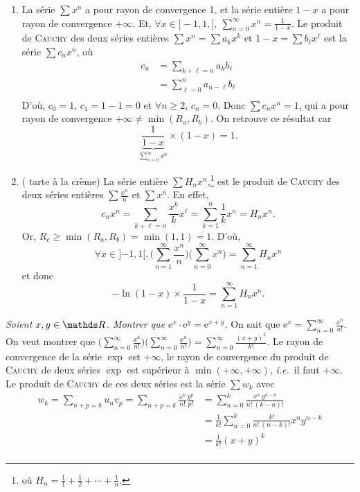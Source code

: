 \begin{exm}
	\begin{enumerate}
		\item La série $\sum x^n$\/ a pour rayon de convergence 1, et la série entière $1 - x$\/ a pour rayon de convergence $+\infty$.
			Et, $\forall x \in {]-1,1,[},\: \sum_{n=0}^\infty x^n = \frac{1}{1-x}$. Le produit de \textsc{Cauchy} des deux séries entières $\sum x^n = \sum a_k x^k$\/ et $1 - x = \sum b_\ell x^\ell$\/ est la série $\sum c_n x^n$, où  
			\begin{align*}
				c_n &= \sum_{k+\ell = n} a_k b_\ell\\
				&= \sum_{\ell=0}^n a_{n-\ell} b_\ell\\
			\end{align*}
			D'où, $c_0 = 1$, $c_1 = 1 - 1 = 0$\/ et $\forall n \ge 2$, $c_n = 0$.
			Donc $\sum c_n x^n = 1$, qui a pour rayon de convergence $+\infty \neq \min(R_a, R_b)$. On retrouve ce résultat car \[
				\underbrace{\frac{1}{1-x}}_{\sum_{n=0}^\infty x^n} \times (1-x) = 1
			.\]
		\item({\color{cyan} tarte à la crème}) La série entière $\sum H_n x^n$,\footnote{où $H_n = \frac{1}{1} + \frac{1}{2} + \cdots + \frac{1}{n}$.} est le produit de \textsc{Cauchy} des deux séries entières $\sum \frac{x^n}{n}$\/ et $\sum x^n$.
			En effet, \[
				c_n x^n = \sum_{k+\ell = n} \frac{x^k}{k} x^\ell = \sum_{k=1}^n \frac{1}{k} x^n = H_n x^n
			.\]
			Or, $R_c \ge \min(R_a, R_b) = \min(1,1) = 1$. D'où, \[
				\forall x \in {]{-1},1[},
				\Big(\sum_{n=1}^\infty \frac{x^n}{n}\Big)\Big(\sum_{n=0}^\infty x^n\Big) = \sum_{n=1}^\infty H_n x^n
			\] et donc \[
				-\ln (1- x) \times \frac{1}{1-x} = \sum_{n=1}^\infty H_n x^n
			.\]
	\end{enumerate}
\end{exm}

\begin{exo}
	\textsl{Soient $x,y \in \R$. Montrer que $\mathrm{e}^x\cdot \mathrm{e}^y = \mathrm{e}^{x+y}$.}
	On sait que $\mathrm{e}^{x} = \sum_{n=0}^\infty \frac{x^n}{n!}$.
	On veut montrer que $\big(\sum_{n=0}^\infty \frac{x^n}{n!}\big)\big(\sum_{n=0}^\infty \frac{x^n}{n!}\big) = \sum_{n=0}^\infty \frac{(x+y)^k}{k!}$. Le rayon de convergence de la série $\exp$\/ est $+\infty$, le rayon de convergence du produit de \textsc{Cauchy} de deux séries $\exp$\/ est supérieur à $\min(+\infty,+\infty)$, \textit{i.e.}\ il faut $+\infty$.
	Le produit de \textsc{Cauchy} de ces deux séries est la série $\sum w_k$\/ avec
	\begin{align*}
		w_k = \sum_{n+p=k} u_n v_p = \sum_{n+p=k} \frac{x^n}{n!} \frac{y^p}{p!}
		&= \sum_{n=0}^k \frac{x^n\: y^{k-n}}{n!\: (k-n)!} \\
		&= \frac{1}{k!}\sum_{n=0}^k \frac{k!}{n!\:(n-k)!} x^n y^{n-k}\\
		&= \frac{1}{k!} (x+y)^k \\
	\end{align*}
\end{exo}


